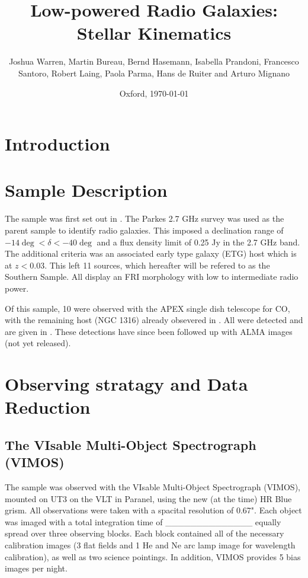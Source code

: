 \documentclass[a4paper,11pt]{article}
\begin{document}
\title{Low-powered Radio Galaxies: Stellar Kinematics}
\author{Joshua Warren, Martin Bureau, Bernd Hasemann, Isabella Prandoni, Francesco Santoro, Robert Laing, Paola Parma, Hans de Ruiter and Arturo Mignano}
\date{Oxford, \today}


\maketitle


\section{Introduction}
	\label{sec:intro}

\section{Sample Description}
	\label{sec:samp}
	The sample was first set out in \cite{Prandoni2010}. The Parkes 2.7 GHz survey was used as the parent sample to identify radio galaxies. This imposed a declination range of $-14\deg < \delta < -40\deg$ and a flux density limit of 0.25 Jy in the 2.7 GHz band. The additional criteria was an associated early type galaxy (ETG) host which is at $z<0.03$. This left 11 sources, which hereafter will be refered to as the Southern Sample. All display an FRI morphology with low to intermediate radio power.

	Of this sample, 10 were observed with the APEX single dish telescope for CO, with the remaining host (NGC 1316) already obsevered in \cite{Horellou2001}. All were detected and are given in \cite{Prandoni2010}. These detections have since been followed up with ALMA images (not yet released). 


\section{Observing stratagy and Data Reduction}
	\label{sec:obs}
	\subsection{The VIsable Multi-Object Spectrograph (VIMOS)}
		\label{subsec:VIMOS}
		The sample was observed with the VIsable Multi-Object Spectrograph (VIMOS), mounted on UT3 on the VLT in Paranel, using the new (at the time) HR Blue grism. All observations were taken with a spacital resolution of 0.67". Each object was imaged with a total integration time of \_\_\_\_\_\_\_\_\_\_\_\_\_\_ equally spread over three observing blocks. Each block contained all of the necessary calibration images (3 flat fields and 1 He and Ne arc lamp image for wavelength calibration), as well as two science pointings. In addition, VIMOS provides 5 bias images per night. 
\end{document}
